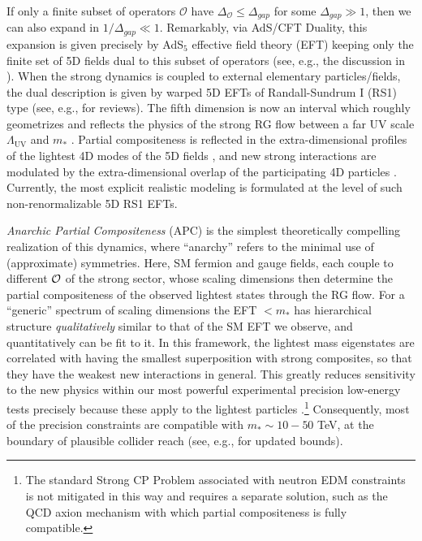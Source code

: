 \documentclass[aps,prl,twocolumn,showpacs,10pt,preprintnumbers,nofootinbib]{revtex4-2}
\newcommand{\op}{\mathcal{O}}
\begin{document}
If only a finite subset of operators $\op$ have $\Delta_{\op} \leq \Delta_{gap}$ for some $\Delta_{gap} \gg 1$, then we can also expand in $1/\Delta_{gap} \ll 1$. Remarkably, via AdS/CFT Duality, this expansion is given precisely by AdS$_5$ effective field theory (EFT) keeping only the finite set of 5D fields dual to this subset of operators (see, e.g., the discussion in \cite{Sundrum:2011ic}). When the strong dynamics is coupled to external elementary particles/fields, the dual description is given by warped 5D EFTs of Randall-Sundrum I (RS1) type \cite{Randall:1999ee} (see, e.g., \cite{Sundrum:2005jf,Gherghetta:2010cj} for reviews). The fifth dimension is now an interval which roughly geometrizes and reflects the physics of the strong RG flow between a far UV scale $\Lambda_{\text{UV}}$ and $m_*$ \cite{Arkani-Hamed:2000ijo,Rattazzi:2000hs}. Partial compositeness is reflected in the extra-dimensional profiles of the lightest 4D modes of the 5D fields \cite{Contino:2003ve,Contino:2004vy,Agashe:2004rs}, and new strong interactions are modulated by the extra-dimensional overlap of the participating 4D particles \cite{Grossman:1999ra,Gherghetta:2000qt}.  Currently, the most explicit realistic modeling  is formulated at the level of such non-renormalizable 5D RS1 EFTs.

{\it Anarchic Partial Compositeness} (APC) is the simplest theoretically compelling realization of this dynamics, where ``anarchy'' refers to the minimal use of (approximate) symmetries. Here, SM fermion and gauge fields, each couple to different ${\cal O}$ of the strong sector, whose scaling dimensions then determine the partial compositeness of the observed lightest states through the RG flow. For a ``generic'' spectrum of scaling dimensions the EFT $< m_*$ has hierarchical structure {\it qualitatively} similar to that of the SM EFT we observe, and quantitatively can be fit to it. 
In this framework, the lightest mass eigenstates are correlated with having the smallest superposition with strong composites, so that they have the weakest new interactions in general. This greatly reduces sensitivity to the new physics within
our most powerful experimental precision low-energy tests precisely because these apply to the lightest particles \cite{Gherghetta:2000qt,Huber:2000ie,Huber:2003tu,Agashe:2004cp}.\footnote{The standard Strong CP Problem associated with neutron EDM constraints is not mitigated in this way and  requires a separate solution, such as the QCD axion mechanism with which partial compositeness is fully compatible.} Consequently, most of the precision constraints are compatible with $m_* \sim 10 - 50$ TeV, at the boundary of plausible collider reach (see, e.g., \cite{Glioti:2024hye} for updated bounds).
\end{document}
